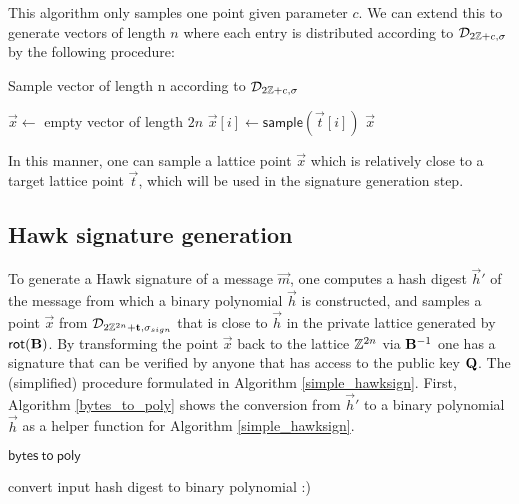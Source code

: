 This algorithm only samples one point given parameter $c$.
We can extend this to generate vectors of length $n$ where each entry is distributed according to $\mathcal{D}_{2\mathbb{Z}+c, \sigma}$ by the following procedure:
\begin{algorithm}[H]
\caption{Sample vector of length n according to $\mathcal{D}_{2\mathbb{Z}+c, \sigma}$}
\begin{algorithmic}[1]
    \State $\vec{x} \gets$ empty vector of length $2n$
    \State $\vec{x}[i] \gets \mathsf{sample}(\vec{t}[i])$
    \EndFor
    \Return $\vec{x}$
\end{algorithmic}
\end{algorithm}

In this manner, one can sample a lattice point $\vec{x}$ which is relatively close to a target lattice point $\vec{t}$, which will be used in the signature generation step.

\subsection{Hawk signature generation}
To generate a Hawk signature of a message $\vec{m}$, one computes a hash digest $\vec{h}'$ of the message from which a binary polynomial $\vec{h}$ is constructed, 
and samples a point $\vec{x}$ from $\mathcal{D}_{2\mathbb{Z}^{2n} + \mathbf{t}, \sigma_{sign}}$ that is close to $\vec{h}$ in the 
private lattice generated by $\mathsf{rot}(\mathbf{B})$. By transforming the point $\vec{x}$ back to the lattice $\mathbb{Z}^{2n}$ via $\mathbf{B}^{-1}$ one has a signature that can be verified 
by anyone that has access to the public key $\mathbf{Q}$.
The (simplified) procedure formulated in Algorithm \ref{simple_hawksign}.
First, Algorithm \ref{bytes_to_poly} shows the conversion from $\vec{h}'$ to a binary polynomial $\vec{h}$ as a helper function for Algorithm \ref{simple_hawksign}.

\begin{algorithm}
    \caption{$\mathsf{bytes \ to \ poly}$}\label{bytes_to_poly}
\begin{algorithmic}[]
    \State convert input hash digest to binary polynomial :)
\end{algorithmic}
\end{algorithm}


